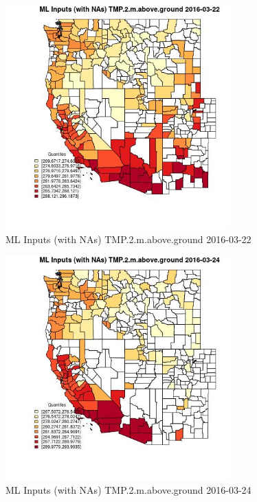 \begin{figure} 
\centering  
\includegraphics[width=0.77\textwidth]{Code_Outputs/Report_ML_input_PM25_Step4_part_e_de_duplicated_aveswNAs_CountyTMP2mabovegroundMean2016-03-22_2016-03-22.jpg} 
\caption{\label{fig:Report_ML_input_PM25_Step4_part_e_de_duplicated_aveswNAsCountyTMP2mabovegroundMean2016-03-22_2016-03-22}ML Inputs (with NAs) TMP.2.m.above.ground 2016-03-22} 
\end{figure} 
 

\begin{figure} 
\centering  
\includegraphics[width=0.77\textwidth]{Code_Outputs/Report_ML_input_PM25_Step4_part_e_de_duplicated_aveswNAs_CountyTMP2mabovegroundMean2016-03-24_2016-03-24.jpg} 
\caption{\label{fig:Report_ML_input_PM25_Step4_part_e_de_duplicated_aveswNAsCountyTMP2mabovegroundMean2016-03-24_2016-03-24}ML Inputs (with NAs) TMP.2.m.above.ground 2016-03-24} 
\end{figure} 
 

